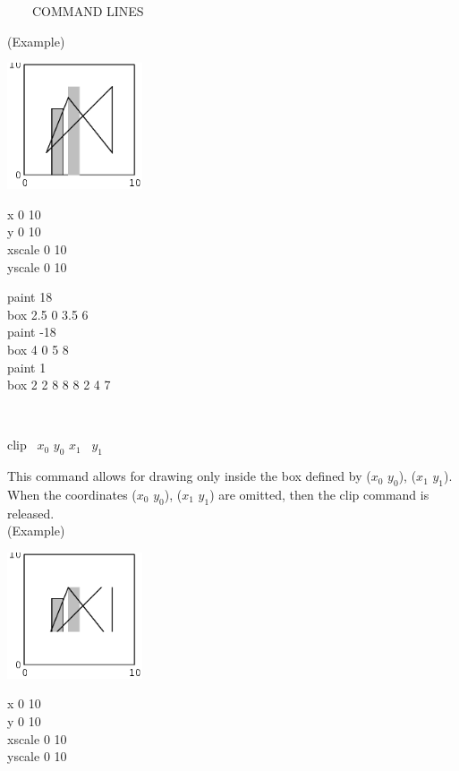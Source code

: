 \begin{qsection}{\ ~~~COMMAND LINES}
\begin{minipage}[t]{9cm}
(Example)\\
\begin{minipage}[t]{4.3cm}
 \includegraphics[width=4cm]{fig/box.eps}
\end{minipage}
\begin{minipage}[b]{4.5cm}
\baselineskip 5pt
x 0 10\\
y 0 10\\
xscale 0 10\\
yscale 0 10

\vspace*{3mm}
paint 18\\
box 2.5 0 3.5 6\\
paint -18 \\
box 4 0 5 8\\
paint 1\\
box  2 2 8 8 8 2 4 7
\end{minipage}
\end{minipage}\\

\begin{minipage}[t]{5.5cm}
clip ~$x_0$ $y_0$ $x_1$ ~$y_1$ 
\end{minipage}
\begin{minipage}[t]{9cm}
This command allows for drawing only inside the box defined by
($x_0$ $y_0$), ($x_1$ $y_1$).
When the coordinates ($x_0$ $y_0$), ($x_1$ $y_1$) are omitted,
then the clip command is released.\\

(Example)\\
\begin{minipage}[t]{4.3cm}
 \includegraphics[width=4cm]{fig/clip.eps}
\end{minipage}
\begin{minipage}[b]{4.5cm}
\baselineskip 5pt
x 0 10\\
y 0 10\\
xscale 0 10\\
yscale 0 10


\end{minipage}
\end{minipage}
\end{qsection}
